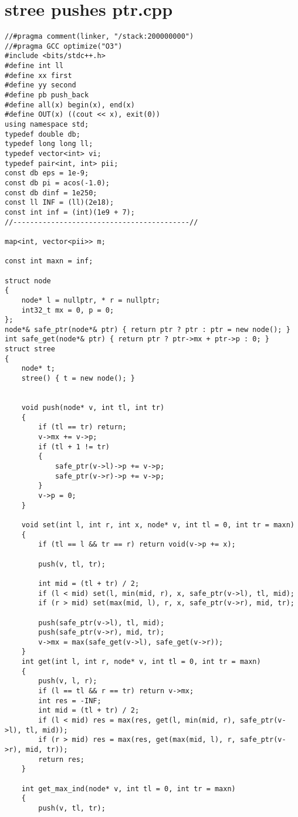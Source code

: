 \documentclass[a4paper,12pt]{report}
\begin{document}
\section{stree pushes ptr.cpp}
\begin{lstlisting}
//#pragma comment(linker, "/stack:200000000")
//#pragma GCC optimize("O3")
#include <bits/stdc++.h>
#define int ll
#define xx first
#define yy second
#define pb push_back
#define all(x) begin(x), end(x)
#define OUT(x) ((cout << x), exit(0))
using namespace std;
typedef double db;
typedef long long ll;
typedef vector<int> vi;
typedef pair<int, int> pii;
const db eps = 1e-9;
const db pi = acos(-1.0);
const db dinf = 1e250;
const ll INF = (ll)(2e18);
const int inf = (int)(1e9 + 7);
//------------------------------------------//

map<int, vector<pii>> m;

const int maxn = inf;

struct node
{
    node* l = nullptr, * r = nullptr;
    int32_t mx = 0, p = 0;
};
node*& safe_ptr(node*& ptr) { return ptr ? ptr : ptr = new node(); }
int safe_get(node*& ptr) { return ptr ? ptr->mx + ptr->p : 0; }
struct stree
{
    node* t;
    stree() { t = new node(); }


    void push(node* v, int tl, int tr)
    {
        if (tl == tr) return;
        v->mx += v->p;
        if (tl + 1 != tr)
        {
            safe_ptr(v->l)->p += v->p;
            safe_ptr(v->r)->p += v->p;
        }
        v->p = 0;
    }

    void set(int l, int r, int x, node* v, int tl = 0, int tr = maxn)
    {
        if (tl == l && tr == r) return void(v->p += x);

        push(v, tl, tr);

        int mid = (tl + tr) / 2;
        if (l < mid) set(l, min(mid, r), x, safe_ptr(v->l), tl, mid);
        if (r > mid) set(max(mid, l), r, x, safe_ptr(v->r), mid, tr);

        push(safe_ptr(v->l), tl, mid);
        push(safe_ptr(v->r), mid, tr);
        v->mx = max(safe_get(v->l), safe_get(v->r));
    }
    int get(int l, int r, node* v, int tl = 0, int tr = maxn)
    {
        push(v, l, r);
        if (l == tl && r == tr) return v->mx;
        int res = -INF;
        int mid = (tl + tr) / 2;
        if (l < mid) res = max(res, get(l, min(mid, r), safe_ptr(v->l), tl, mid));
        if (r > mid) res = max(res, get(max(mid, l), r, safe_ptr(v->r), mid, tr));
        return res;
    }

    int get_max_ind(node* v, int tl = 0, int tr = maxn)
    {
        push(v, tl, tr);


\end{lstlisting}
\end{document}
